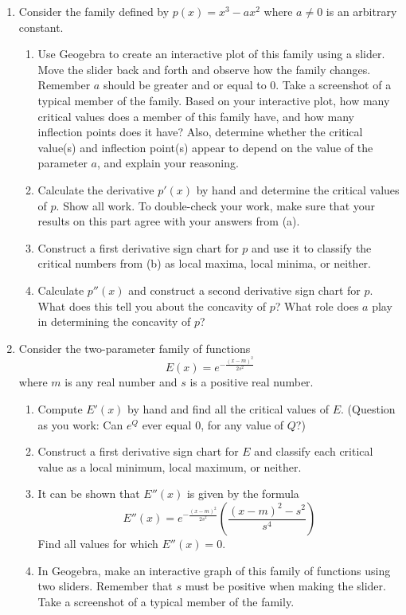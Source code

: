 \documentclass[11pt,letterpaper]{article}
\begin{document}
\begin{enumerate}
	\item Consider the family defined by $p(x) = x^3 - ax^2$ where $a \neq 0$ is an arbitrary constant.
	\begin{enumerate}
		\item Use Geogebra to create an interactive plot of this family using a slider. Move the slider back and forth and observe how the family changes. Remember $a$ should be greater and or equal to $0$. Take a screenshot of a typical member of the family. Based on your interactive plot, how many critical values does a member of this family have, and how many inflection points does it have? Also, determine whether the critical value(s) and inflection point(s) appear to depend on the value of the parameter $a$, and explain your reasoning.
		\item Calculate the derivative $p'(x)$ by hand and determine the critical values of $p$. Show all work. To double-check your work, make sure that your results on this part agree with your answers from (a).
		\item Construct a first derivative sign chart for $p$ and use it to classify the critical numbers from (b) as local maxima, local minima, or neither.  
		\item Calculate $p''(x)$ and construct a second derivative sign chart for $p$. What does this tell you about the concavity of $p$? What role does $a$ play in determining the concavity of $p$? 
	\end{enumerate}

	\item Consider the two-parameter family of functions 
	$$E(x) = e^{- \frac{(x-m)^2}{2s^2}}$$
	where $m$ is any real number and $s$ is a positive real number. 

	\begin{enumerate}
		\item Compute $E'(x)$ by hand and find all the critical values of $E$. (Question as you work: Can $e^Q$ ever equal $0$, for any value of $Q$?)
		\item Construct a first derivative sign chart for $E$ and classify each critical value as a local minimum, local maximum, or neither. 
		\item It can be shown that $E''(x)$ is given by the formula
		$$E''(x) = e^{- \frac{(x-m)^2}{2s^2}} \left( \frac{(x-m)^2 - s^2}{s^4} \right)$$
		Find all values for which $E''(x) = 0$. 
		\item In Geogebra, make an interactive graph of this family of functions using two sliders. Remember that $s$ must be positive when making the slider. Take a screenshot of a typical member of the family. 
	\end{enumerate}

\end{enumerate}
\end{document}
